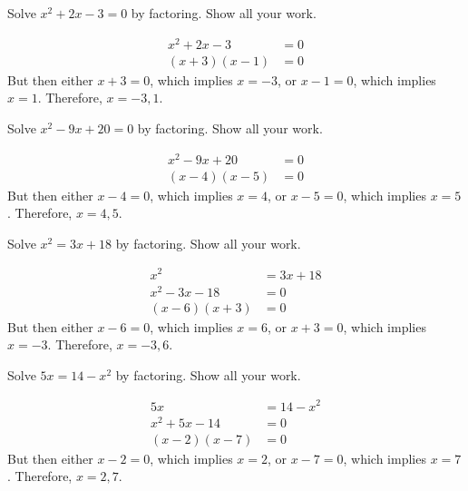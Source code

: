 \documentclass[11pt,letterpaper]{article}
\begin{document}

 Solve $x^2 + 2x - 3= 0$ by factoring. Show all your work. \pspace

\sol
	\[
	\begin{aligned}
	x^2 + 2x - 3&= 0 \\[0.3cm]
	(x + 3)(x - 1)&= 0
	\end{aligned}
	\] \pspace
But then either $x + 3= 0$, which implies $x= -3$, or $x - 1=0$, which implies $x= 1$. Therefore, $x= -3, 1$. 





\newpage





 Solve $x^2 - 9x + 20= 0$ by factoring. Show all your work. \pspace

\sol
	\[
	\begin{aligned}
	x^2 - 9x + 20&= 0 \\[0.3cm]
	(x - 4)(x - 5)&= 0 
	\end{aligned}
	\] \pspace
But then either $x - 4= 0$, which implies $x= 4$, or $x - 5= 0$, which implies $x= 5$. Therefore, $x= 4, 5$. 





\newpage





 Solve $x^2= 3x + 18$ by factoring. Show all your work. \pspace

\sol
	\[
	\begin{aligned}
	x^2&= 3x + 18 \\[0.3cm]
	x^2 - 3x - 18&= 0 \\[0.3cm]
	(x - 6)(x + 3)&= 0 
	\end{aligned}
	\] \pspace
But then either $x - 6=0$, which implies $x= 6$, or $x + 3= 0$, which implies $x= -3$. Therefore, $x= -3, 6$. 





\newpage





 Solve $5x= 14 - x^2$ by factoring. Show all your work. \pspace

\sol
	\[
	\begin{aligned}
	5x&= 14 - x^2 \\[0.3cm]
	x^2 + 5x - 14&= 0 \\[0.3cm]
	(x - 2)(x - 7)&= 0 
	\end{aligned}
	\] \pspace
But then either $x - 2=0$, which implies $x= 2$, or $x - 7=0$, which implies $x= 7$. Therefore, $x= 2, 7$.
\end{document}
